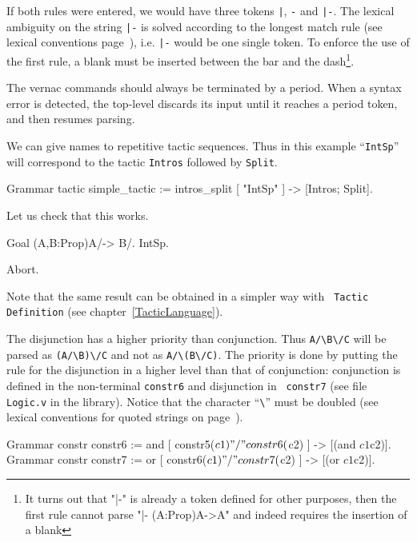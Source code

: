 \noindent If both rules were entered, we would have three tokens
\verb+|+, \verb+-+ and \verb+|-+. The lexical ambiguity on the string
\verb+|-+ is solved according to the longest match rule (see lexical
conventions page~\pageref{lexical}), i.e. \verb+|-+ would be one
single token. To enforce the use of the first rule, a blank must be
inserted between the bar and the dash\footnote{It turns out that "|-"
is already a token defined for other purposes, then the first rule
cannot parse "|- (A:Prop)A->A" and indeed requires the insertion of a blank}.


\Rem
The vernac commands should always be terminated by a period. When a
syntax error is detected, the top-level discards its input until it
reaches a period token, and then resumes parsing.


We can give names to repetitive tactic sequences. Thus in this example
``{\tt IntSp}'' will correspond to the tactic {\tt Intros} followed by
{\tt Split}.

\begin{coq_example}
Grammar tactic simple_tactic :=
  intros_split [ "IntSp" ] -> [Intros; Split].
\end{coq_example}

Let us check that this works.

\begin{coq_example}
Goal (A,B:Prop)A/\B -> B/\A.
IntSp.
\end{coq_example}
\begin{coq_eval}
Abort.
\end{coq_eval}

Note that the same result can be obtained in a simpler way with {\tt
Tactic Definition} (see chapter~\ref{TacticLanguage}).


The disjunction has a higher priority than conjunction.  Thus
\verb+A/\B\/C+ will be parsed as \verb+(A/\B)\/C+ and not as
\verb+A/\(B\/C)+. The priority is done by putting the rule for the
disjunction in a higher level than that of conjunction: conjunction is
defined in the non-terminal {\tt constr6} and disjunction in {\tt
constr7} (see file {\tt Logic.v} in the library). Notice that
the character ``\verb+\+'' must be doubled (see lexical conventions
for quoted strings on page~\pageref{lexical}).

\begin{coq_example*}
Grammar constr constr6 := 
  and [ constr5($c1) "/\\" constr6($c2) ] -> [(and $c1 $c2)].
Grammar constr constr7 :=
  or  [ constr6($c1) "\\/" constr7($c2) ] -> [(or $c1 $c2)].
\end{coq_example*}

